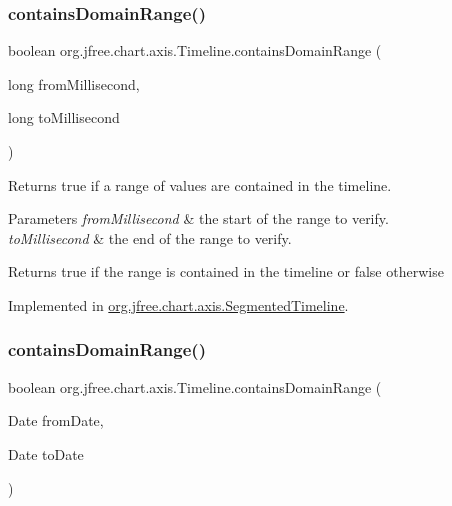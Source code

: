 \subsubsection{\texorpdfstring{contains\+Domain\+Range()}{containsDomainRange()}\hspace{0.1cm}{\footnotesize\ttfamily [1/2]}}
{\footnotesize\ttfamily boolean org.\+jfree.\+chart.\+axis.\+Timeline.\+contains\+Domain\+Range (\begin{DoxyParamCaption}\item[{long}]{from\+Millisecond,  }\item[{long}]{to\+Millisecond }\end{DoxyParamCaption})}

Returns {\ttfamily true} if a range of values are contained in the timeline.


\begin{DoxyParams}{Parameters}
{\em from\+Millisecond} & the start of the range to verify. \\
\hline
{\em to\+Millisecond} & the end of the range to verify.\\
\hline
\end{DoxyParams}
\begin{DoxyReturn}{Returns}
{\ttfamily true} if the range is contained in the timeline or {\ttfamily false} otherwise 
\end{DoxyReturn}


Implemented in \mbox{\hyperlink{classorg_1_1jfree_1_1chart_1_1axis_1_1_segmented_timeline_afd857a016b41d3169350c0e506382f6e}{org.\+jfree.\+chart.\+axis.\+Segmented\+Timeline}}.

\mbox{\label{interfaceorg_1_1jfree_1_1chart_1_1axis_1_1_timeline_a9338cd3f5d7956c15d9716d4b1e4e5e8}} 
\subsubsection{\texorpdfstring{contains\+Domain\+Range()}{containsDomainRange()}\hspace{0.1cm}{\footnotesize\ttfamily [2/2]}}
{\footnotesize\ttfamily boolean org.\+jfree.\+chart.\+axis.\+Timeline.\+contains\+Domain\+Range (\begin{DoxyParamCaption}\item[{Date}]{from\+Date,  }\item[{Date}]{to\+Date }\end{DoxyParamCaption})}

